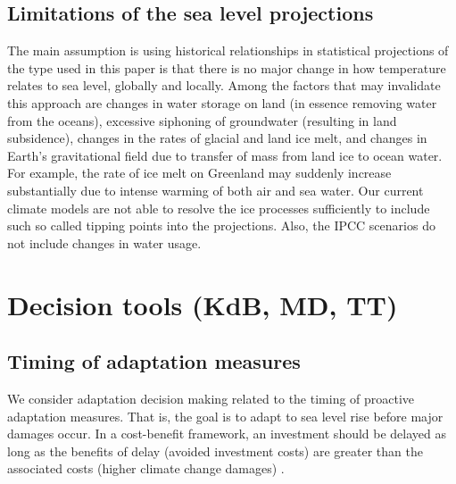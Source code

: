 \documentclass[wrr, draft]{agutex}
\begin{document}
\begin{article}
\subsection{Limitations of the sea level projections}
The main assumption is using historical relationships in statistical projections of the type used in this paper is that there is no major change in how temperature relates to sea level, globally and locally. Among the factors that may invalidate this approach are changes in water storage on land (in essence removing water from the oceans), excessive siphoning of groundwater (resulting in land subsidence), changes in the rates of glacial and land ice melt, and changes in Earth's gravitational field due to transfer of mass from land ice to ocean water. For example, the rate of ice melt on Greenland may suddenly increase substantially due to intense warming of both air and sea water. Our current climate models are not able to resolve the ice processes sufficiently to include such so called tipping points into the projections. Also, the IPCC scenarios \citep{change} do not include changes in water usage.

\section{Decision tools {\color{blue} (KdB, MD, TT)}}

\subsection{Timing of adaptation measures}

We consider adaptation decision making related to the timing of proactive adaptation measures. That is, the goal is to adapt to sea level rise before major damages occur. In a cost-benefit framework, an investment should be delayed as long as the benefits of delay (avoided investment costs) are greater than the associated costs (higher climate change damages) \citep{Fankhauser&1999}.


\end{article}
\end{document}
